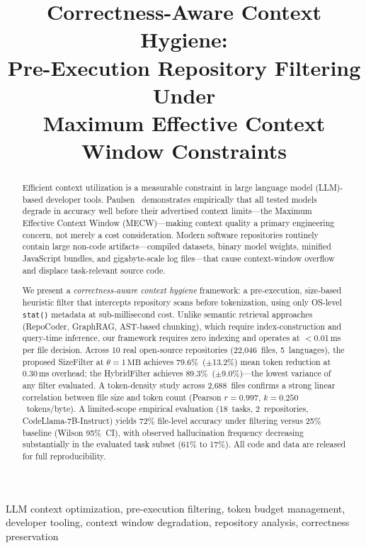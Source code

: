 \documentclass[conference]{IEEEtran}
\title{Correctness-Aware Context Hygiene:\\
Pre-Execution Repository Filtering Under\\
Maximum Effective Context Window Constraints}
\author{%
  \IEEEauthorblockN{Shweta Mishra}
  \IEEEauthorblockA{Independent Researcher\\
  shweta.mishra.research@gmail.com}
}
\begin{document}
\maketitle

\begin{abstract}
Efficient context utilization is a measurable constraint in large
language model (LLM)-based developer tools. Paulsen~\cite{paulsen2025}
demonstrates empirically that all tested models degrade in accuracy
well before their advertised context limits---the Maximum Effective
Context Window (MECW)---making context quality a primary engineering
concern, not merely a cost consideration. Modern software repositories
routinely contain large non-code artifacts---compiled datasets, binary
model weights, minified JavaScript bundles, and gigabyte-scale log
files---that cause context-window overflow and displace task-relevant
source code.

We present a \emph{correctness-aware context hygiene} framework: a
pre-execution, size-based heuristic filter that intercepts repository
scans before tokenization, using only OS-level \texttt{stat()} metadata
at sub-millisecond cost. Unlike semantic retrieval approaches
(RepoCoder, GraphRAG, AST-based chunking), which require
index-construction and query-time inference, our framework requires zero
indexing and operates at $<$0.01\,ms per file decision. Across 10 real
open-source repositories (22,046~files, 5~languages), the proposed
SizeFilter at $\theta{=}1\,\text{MB}$ achieves 79.6\%~($\pm$13.2\%)
mean token reduction at 0.30\,ms overhead; the HybridFilter achieves
89.3\%~($\pm$9.0\%)---the lowest variance of any filter evaluated. A
token-density study across 2,688~files confirms a strong linear
correlation between file size and token count
(Pearson $r{=}0.997$, $k{=}0.250$~tokens/byte). A limited-scope
empirical evaluation (18~tasks, 2~repositories,
CodeLlama-7B-Instruct) yields 72\% file-level accuracy under filtering
versus 25\% baseline (Wilson 95\%~CI), with observed hallucination
frequency decreasing substantially in the evaluated task subset
(61\% to 17\%). All code and data are released for full
reproducibility.
\end{abstract}

\begin{IEEEkeywords}
LLM context optimization, pre-execution filtering, token budget
management, developer tooling, context window degradation, repository
analysis, correctness preservation
\end{IEEEkeywords}
\end{document}
